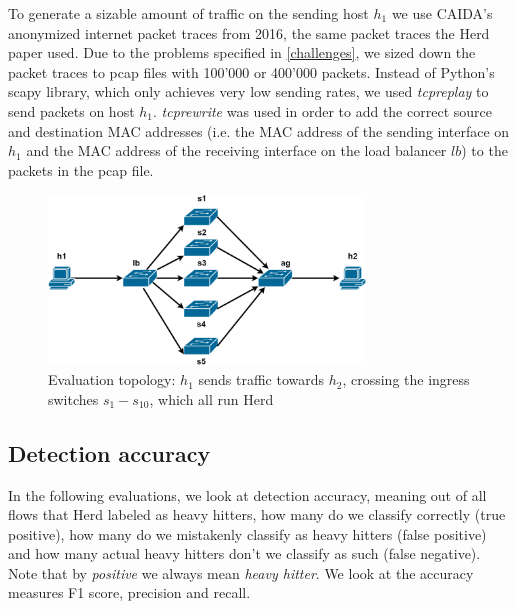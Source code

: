 \documentclass[11pt,oneside,a4paper]{article}
\begin{document}
\noindent To generate a sizable amount of traffic on the sending host $h_1$ we use CAIDA's anonymized internet packet traces from 2016, the same packet traces the Herd paper used. Due to the problems specified in \ref{challenges}, we sized down the packet traces to pcap files with 100'000 or 400'000 packets. Instead of Python's scapy library, which only achieves very low sending rates, we used \textit{tcpreplay} to send packets on host $h_1$. \textit{tcprewrite} was used in order to add the correct source and destination MAC addresses (i.e. the MAC address of the sending interface on $h_1$ and the MAC address of the receiving interface on the load balancer $lb$) to the packets in the pcap file.


\begin{figure}
	\centering
	\includegraphics[width=0.75\textwidth]{figures/Herd_topology}
	\caption{Evaluation topology: $h_1$ sends traffic towards $h_2$, crossing the ingress switches $s_1 - s_{10}$, which all run Herd}
	\label{fig:topology_fig}
\end{figure}

\subsection{Detection accuracy} \label{accuracy}

In the following evaluations, we look at detection accuracy, meaning out of all flows that Herd labeled as heavy hitters, how many do we classify correctly (true positive), how many do we mistakenly classify as heavy hitters (false positive) and how many actual heavy hitters don't we classify as such (false negative). Note that by \textit{positive} we always mean \textit{heavy hitter}. We look at the accuracy measures F1 score, precision and recall.



\end{document}
